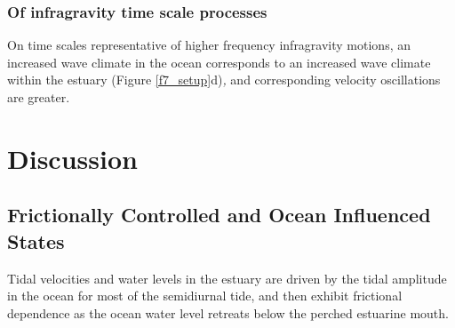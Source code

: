 \subsubsection{Of infragravity time scale processes}

On time scales representative of higher frequency infragravity motions,
an increased wave climate in the ocean corresponds to an increased
wave climate within the estuary (Figure \ref{f7_setup}d)\emph{, }and corresponding velocity oscillations are greater.





\section{Discussion}


\subsection{Frictionally Controlled and Ocean Influenced States\label{sub:disc_FC_tides}}

Tidal velocities and water levels in the estuary are driven by the
tidal amplitude in the ocean for most of the semidiurnal tide, and
then exhibit frictional dependence as the ocean water level retreats
below the perched estuarine mouth. 

